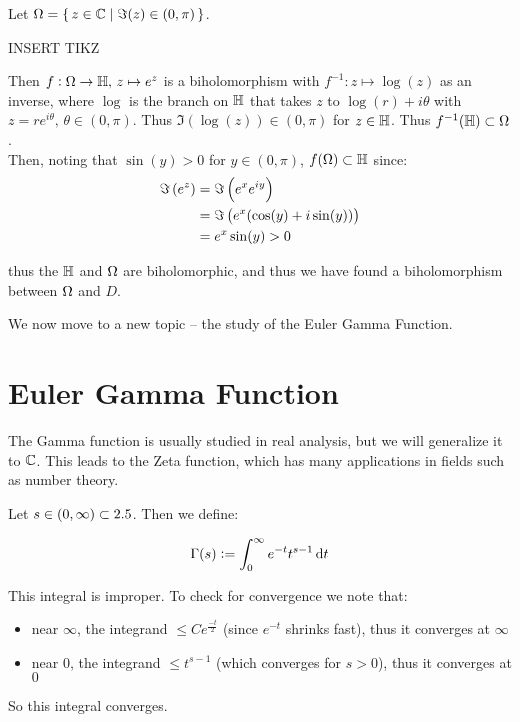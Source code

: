 \begin{example}

Let $\Omega = \set{z \in \mathbb{C}\mid \Im(z) \in (0, \pi) }$.

INSERT TIKZ

Then $f: \Omega \to \mathbb{H}, \, z \mapsto e^z$ is a biholomorphism with $f^{-1} : z \mapsto \log(z)$ as an inverse, where $\log$ is the branch on $\mathbb{H}$ that takes $z$ to $\log(r) + i \theta$ with $ z = re^{i \theta}, \, \theta \in (0, \pi)$. Thus $\Im (\log(z)) \in (0, \pi)$ for $z \in \mathbb{H}$. Thus $f^{-1} (\mathbb{H}) \subset \Omega$.\\

Then, noting that $\sin(y) > 0$ for $y \in (0,\pi)$, $f(\Omega) \subset \mathbb{H}$ since:
\begin{align*}
    \Im \left( e^z \right) &= \Im \left( e^x e^{iy} \right)\\
    &= \Im \left( e^x(\cos(y) + i \sin(y)) \right)\\
    &= e^x \sin(y) > 0
\end{align*}

thus the $\mathbb{H}$ and $\Omega$ are biholomorphic, and thus we have found a biholomorphism between $\Omega$ and $D$.

\end{example}

We now move to a new topic -- the study of the Euler Gamma Function.

\section{Euler Gamma Function}

The Gamma function is usually studied in real analysis, but we will generalize it to $\mathbb{C}$. This leads to the Zeta function, which has many applications in fields such as number theory.

\begin{definition}

Let $s \in (0,\infty) \subset 2.5$. Then we define:

\begin{align*}
    \Gamma(s) \defas \int_0^\infty e^{-t} t^{s-1} \dif t
\end{align*}

\end{definition}

\begin{remark}
This integral is improper. To check for convergence we note that:
\begin{itemize}
    \item near $\infty$, the integrand $\leq C e^{\frac{-t}{2}}$ (since $e^{-t}$ shrinks fast), thus it converges at $\infty$
    \item near $0$,  the integrand $\leq t^{s-1}$ (which converges for $s>0$), thus it converges at $0$
\end{itemize}

So this integral converges.

\end{remark}

